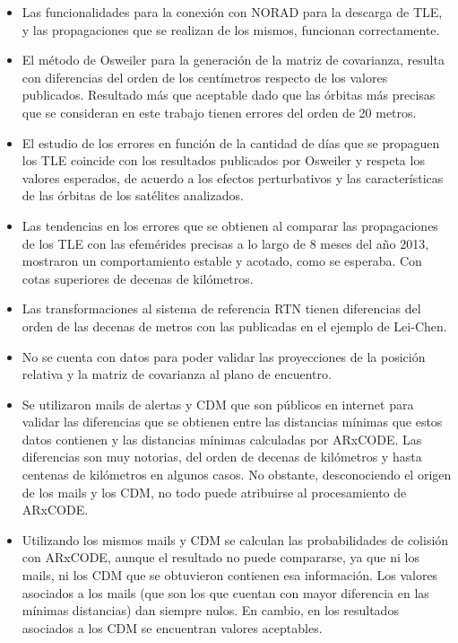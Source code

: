  \begin{itemize}
  \item Las funcionalidades para la conexi\'on con NORAD para la descarga de TLE, y las propagaciones que se realizan de los mismos, funcionan correctamente.\\
  \item El m\'etodo de Osweiler para la generaci\'on de la matriz de covarianza, resulta con diferencias del orden de los cent\'imetros respecto de los valores publicados. Resultado m\'as que aceptable dado que las \'orbitas m\'as precisas que se consideran en este trabajo tienen errores del orden de 20 metros.\\
  \item El estudio de los errores en funci\'on de la cantidad de d\'ias que se propaguen los TLE coincide con los resultados publicados por Osweiler y respeta los valores esperados, de acuerdo a los efectos perturbativos y las caracter\'isticas de las \'orbitas de los sat\'elites analizados.\\
  \item Las tendencias en los errores que se obtienen al comparar las propagaciones de los TLE con las efem\'erides precisas a lo largo de 8 meses del a\~no 2013, mostraron un comportamiento estable y acotado, como se esperaba. Con cotas superiores de decenas de kil\'ometros.\\
  \item Las transformaciones al sistema de referencia RTN tienen diferencias del orden de las decenas de metros con las publicadas en el ejemplo de Lei-Chen.\\
  \item No se cuenta con datos para poder validar las proyecciones de la posici\'on relativa y la matriz de covarianza al plano de encuentro.\\
  \item Se utilizaron mails de alertas y CDM que son p\'ublicos en internet para validar las diferencias que se obtienen entre las distancias m\'inimas que estos datos contienen y las distancias m\'inimas calculadas por ARxCODE. Las diferencias son muy notorias, del orden de decenas de kil\'ometros y hasta centenas de kil\'ometros en algunos casos. No obstante, desconociendo el origen de los mails y los CDM, no todo puede atribuirse al procesamiento de ARxCODE.\\
  \item Utilizando los mismos mails y CDM se calculan las probabilidades de colisi\'on con ARxCODE, aunque el resultado no puede compararse, ya que ni los mails, ni los CDM que se obtuvieron contienen esa informaci\'on. Los valores asociados a los mails (que son los que cuentan con mayor diferencia en las m\'inimas distancias) dan siempre nulos. En cambio, en los resultados asociados a los CDM se encuentran valores aceptables.\\
 \end{itemize}
